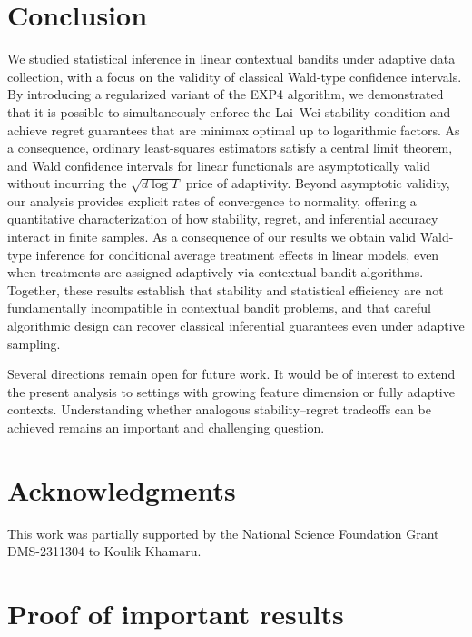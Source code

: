 \documentclass[11pt,letterpaper]{article}
\theoremstyle{plain}
\theoremstyle{definition}  %
\begin{document}
\section{Conclusion}
\noindent
We studied statistical inference in linear contextual bandits under adaptive data collection, with a
focus on the validity of classical Wald-type confidence intervals. By introducing a regularized variant
of the EXP4 algorithm, we demonstrated that it is possible to simultaneously enforce the Lai--Wei
stability condition and achieve regret guarantees that are minimax optimal up to logarithmic
factors. As a consequence, ordinary least-squares estimators satisfy a central limit theorem, and
Wald confidence intervals for linear functionals are asymptotically valid without incurring the
$\sqrt{d\log T}$ price of adaptivity. Beyond asymptotic validity, our analysis provides explicit rates of convergence to normality,
offering a quantitative characterization of how stability, regret, and inferential accuracy interact
in finite samples. As a consequence of our results we obtain valid Wald-type inference for conditional average treatment effects in linear models, even when treatments are assigned adaptively via contextual bandit algorithms. Together, these results establish that stability and statistical efficiency are not
fundamentally incompatible in contextual bandit problems, and that careful algorithmic design can
recover classical inferential guarantees even under adaptive sampling.

Several directions remain open for future work. It would be of interest to extend the present
analysis to settings with growing feature dimension or fully adaptive
contexts. Understanding whether analogous stability--regret tradeoffs can be achieved remains an important and challenging question.




\section*{Acknowledgments}
This work was partially supported by the National Science Foundation Grant DMS-2311304 to Koulik Khamaru.






\newpage

\appendix 


\section{Proof of important results}\label{append:imp}
\end{document}
